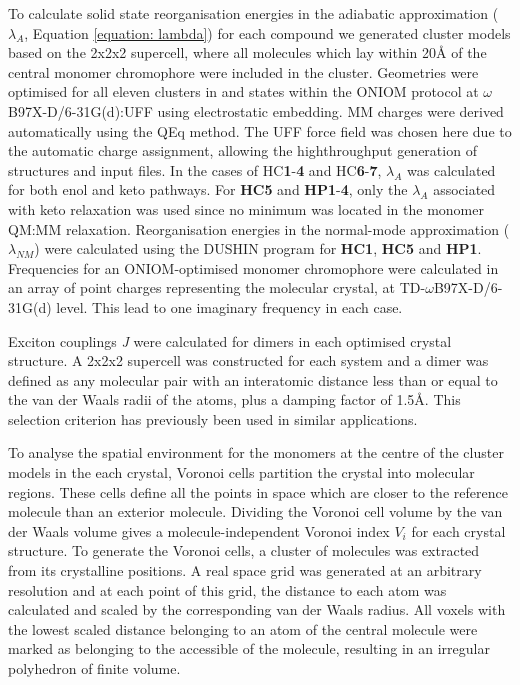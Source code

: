 To calculate solid state reorganisation energies in the adiabatic approximation ($\lambda_{A}$, Equation \ref{equation: lambda}) for each compound we generated cluster models based on the 2x2x2 supercell, where all molecules which lay within 20{\AA} of the central monomer chromophore were included in the cluster. Geometries were optimised for all eleven clusters in \sone{} and \szero{} states within the ONIOM protocol at $\omega$B97X-D/6-31G(d):UFF using electrostatic embedding. MM charges were derived automatically using the QEq method.\cite{Rappe2007} The UFF force field was chosen here due to the automatic charge assignment, allowing the highthroughput generation of structures and input files. In the cases of \ac{HC}\textbf{1}-\textbf{4} and \ac{HC}\textbf{6}-\textbf{7}, $\lambda_{A}$ was calculated for both enol and keto pathways. For \textbf{HC5} and \textbf{HP1}-\textbf{4}, only the $\lambda_{A}$ associated with keto relaxation was used since no \Estar{} minimum was located in the monomer QM:MM relaxation. Reorganisation energies in the normal-mode approximation ($\lambda_{NM}$) were calculated using the DUSHIN program for \textbf{HC1}, \textbf{HC5} and \textbf{HP1}.\cite{Reimers2001} Frequencies for an ONIOM-optimised monomer chromophore were calculated in an array of point charges representing the molecular crystal, at TD-$\omega$B97X-D/6-31G(d) level. This lead to one imaginary frequency in each case.

Exciton couplings \textit{J} were calculated for dimers in each optimised crystal structure. A 2x2x2 supercell was constructed for each system and a dimer was defined as any molecular pair with an interatomic distance less than or equal to the van der Waals radii of the atoms, plus a damping factor of 1.5\AA. This selection criterion has previously been used in similar applications.\cite{Campbell2017} 

To analyse the spatial environment for the monomers at the centre of the cluster models in the each crystal, Voronoi cells partition the crystal into molecular regions. These cells define all the points in space which are closer to the reference molecule than an exterior molecule. Dividing the Voronoi cell volume by the van der Waals volume gives a molecule-independent Voronoi index $V_{i}$ for each crystal structure. To generate the Voronoi cells, a cluster of molecules was extracted from its crystalline positions. A real space grid was generated at an arbitrary resolution and at each point of this grid, the distance to each atom was calculated and scaled by the corresponding van der Waals radius. All voxels with the lowest scaled distance belonging to an atom of the central molecule were marked as belonging to the accessible of the molecule, resulting in an irregular polyhedron of finite volume. 

